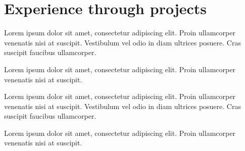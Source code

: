\documentclass[]{plushcv}
\begin{document}
\begin{minipage}[t]{0.70\textwidth}
\section{Experience through projects}

\begin{tightemize}
\item Lorem ipsum dolor sit amet, consectetur adipiscing elit. Proin ullamcorper venenatis nisi at suscipit. Vestibulum vel odio in diam ultrices posuere. Cras suscipit faucibus ullamcorper.
\item Lorem ipsum dolor sit amet, consectetur adipiscing elit. Proin ullamcorper venenatis nisi at suscipit.
\end{tightemize}
\sectionsep

\begin{tightemize}
\item Lorem ipsum dolor sit amet, consectetur adipiscing elit. Proin ullamcorper venenatis nisi at suscipit. Vestibulum vel odio in diam ultrices posuere. Cras suscipit faucibus ullamcorper. 
\item Lorem ipsum dolor sit amet, consectetur adipiscing elit. Proin ullamcorper venenatis nisi at suscipit.
\end{tightemize}
\sectionsep

%
%

\end{minipage} 
\hfill
\end{document}
